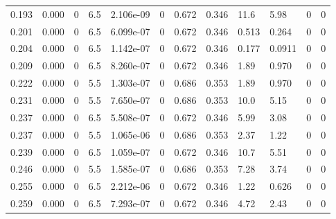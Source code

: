 \documentclass[preview]{standalone}
\begin{document}
{{\begin{tabular}{L{1.2cm}C{1.2cm} C{0.3cm}C{0.5cm} C{1.4cm}C{1.4cm} C{1.4cm}C{1.4cm} C{1.6cm}C{1.6cm} C{1.6cm}C{1.6cm}}
  0.193  &  0.000  & 0     & 6.5 &  2.106e-09  & 0  &  0.672&   0.346& 11.6 & 5.98   &  0 & 0  \\ 
  0.201  &  0.000  & 0     & 6.5 &  6.099e-07  & 0  &  0.672&   0.346& 0.513 & 0.264   &  0 & 0  \\ 
  0.204  &  0.000  & 0     & 6.5 &  1.142e-07  & 0  &  0.672&   0.346& 0.177 & 0.0911   &  0 & 0  \\ 
  0.209  &  0.000  & 0     & 6.5 &  8.260e-07  & 0  &  0.672&   0.346& 1.89 & 0.970   &  0 & 0  \\ 
  0.222  &  0.000  & 0     & 5.5 &  1.303e-07  & 0  &  0.686&   0.353& 1.89 & 0.970   &  0 & 0  \\ 
  0.231  &  0.000  & 0     & 5.5 &  7.650e-07  & 0  &  0.686&   0.353& 10.0 & 5.15   &  0 & 0  \\ 
  0.237  &  0.000  & 0     & 6.5 &  5.508e-07  & 0  &  0.672&   0.346& 5.99 & 3.08   &  0 & 0  \\ 
  0.237  &  0.000  & 0     & 5.5 &  1.065e-06  & 0  &  0.686&   0.353& 2.37 & 1.22   &  0 & 0  \\ 
  0.239  &  0.000  & 0     & 6.5 &  1.059e-07  & 0  &  0.672&   0.346& 10.7 & 5.51   &  0 & 0  \\ 
  0.246  &  0.000  & 0     & 5.5 &  1.585e-07  & 0  &  0.686&   0.353& 7.28 & 3.74   &  0 & 0  \\ 
  0.255  &  0.000  & 0     & 6.5 &  2.212e-06  & 0  &  0.672&   0.346& 1.22 & 0.626   &  0 & 0  \\ 
  0.259  &  0.000  & 0     & 6.5 &  7.293e-07  & 0  &  0.672&   0.346& 4.72 & 2.43   &  0 & 0  \\ 
\hline 
\end{tabular} 

}}
\end{document}
